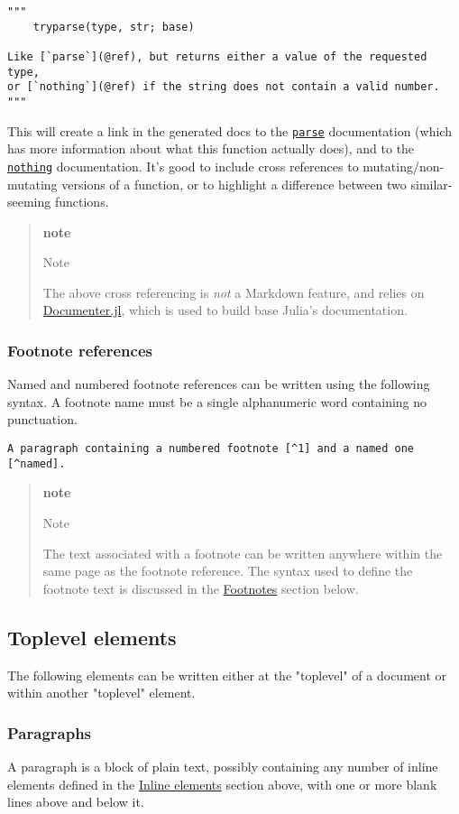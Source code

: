 \begin{verbatim}
"""
    tryparse(type, str; base)

Like [`parse`](@ref), but returns either a value of the requested type,
or [`nothing`](@ref) if the string does not contain a valid number.
"""
\end{verbatim}
This will create a link in the generated docs to the \href{@ref}{\texttt{parse}} documentation (which has more information about what this function actually does), and to the \href{@ref}{\texttt{nothing}} documentation. It's good to include cross references to mutating/non-mutating versions of a function, or to highlight a difference between two similar-seeming functions.

\begin{quote}
\textbf{note}

Note

The above cross referencing is \emph{not} a Markdown feature, and relies on \href{https://github.com/JuliaDocs/Documenter.jl}{Documenter.jl}, which is used to build base Julia's documentation.

\end{quote}
\subsubsection{Footnote references}
Named and numbered footnote references can be written using the following syntax. A footnote name must be a single alphanumeric word containing no punctuation.

\begin{verbatim}
A paragraph containing a numbered footnote [^1] and a named one [^named].
\end{verbatim}
\begin{quote}
\textbf{note}

Note

The text associated with a footnote can be written anywhere within the same page as the footnote reference. The syntax used to define the footnote text is discussed in the \href{@ref}{Footnotes} section below.

\end{quote}
\subsection{Toplevel elements}
The following elements can be written either at the "toplevel" of a document or within another "toplevel" element.

\subsubsection{Paragraphs}
A paragraph is a block of plain text, possibly containing any number of inline elements defined in the \href{@ref}{Inline elements} section above, with one or more blank lines above and below it.

